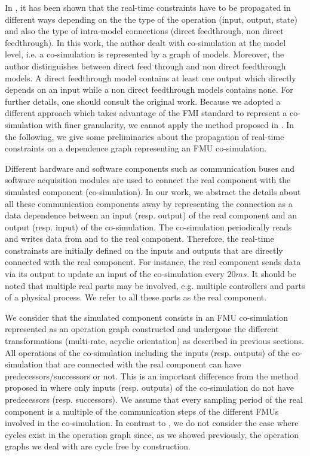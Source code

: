 In \cite{faure:2011}, it has been shown that the real-time constraints have to be propagated in different ways depending on the the type of the operation (input, output, state) and also the type of intra-model connections (direct feedthrough, non direct feedthrough). In this work, the author dealt with co-simulation at the model level, i.e. a co-simulation is represented by a graph of models. Moreover, the author distinguishes between direct feed through and non direct feedthrough models. A direct feedthrough model contains at least one output which directly depends on an input while a non direct feedthrough models contains none. For further details, one should consult the original work. Because we adopted a different approach which takes advantage of the FMI standard to represent a co-simulation with finer granularity, we cannot apply the method proposed in \cite{faure:2011}. In the following, we give some preliminaries about the propagation of real-time constraints on a dependence graph representing an FMU co-simulation. 

Different hardware and software components such as communication buses and software acquisition modules are used to connect the real component with the simulated component (co-simulation). In our work, we abstract the details about all these communication components away by representing the connection as a data dependence between an input (resp. output) of the real component and an output (resp. input) of the co-simulation. The co-simulation periodically reads and writes data from and to the real component. Therefore, the real-time constrainsts are initially defined on the inputs and outputs that are directly connected with the real component. For instance, the real component sends data via its output to update an input of the co-simulation every $20ms$. It should be noted that multiple real parts may be involved, e.g. multiple controllers and parts of a physical process. We refer to all these parts as the real component.

We consider that the simulated component consists in an FMU co-simulation represented as an operation graph constructed and undergone the different transformations (multi-rate, acyclic orientation) as described in previous sections. All operations of the co-simulation including the inputs (resp. outputs) of the co-simulation that are connected with the real component can have predecessors/successors or not. This is an important difference from the method proposed in \cite{faure:2011} where only inputs (resp. outputs) of the co-simulation do not have predecessors (resp. successors). We assume that every sampling period of the real component is a multiple of the communication steps of the different FMUs involved in the co-simulation. In contrast to \cite{faure:2011}, we do not consider the case where cycles exist in the operation graph since, as we showed previously, the operation graphs we deal with are cycle free by construction. 

